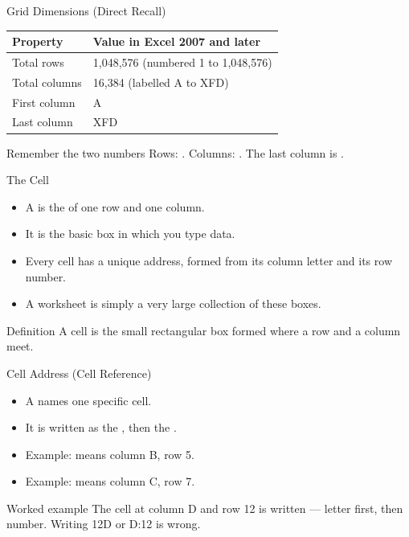 \documentclass[aspectratio=169]{beamer}
\begin{document}
\begin{frame}{Grid Dimensions (Direct Recall)}
  \begin{center}
    \begin{tabular}{ll}
      \toprule
      \textbf{Property} & \textbf{Value in Excel 2007 and later} \\
      \midrule
      Total rows & 1,048,576 (numbered 1 to 1,048,576) \\
      Total columns & 16,384 (labelled A to XFD) \\
      First column & A \\
      Last column & XFD \\
      \bottomrule
    \end{tabular}
  \end{center}
  \vspace{0.3cm}
  \begin{alertblock}{Remember the two numbers}
    Rows: . Columns: . The last column is
    .
  \end{alertblock}
\end{frame}

\begin{frame}{The Cell}
  \begin{itemize}
    \item A  is the  of one row and one column.
    \item It is the basic box in which you type data.
    \item Every cell has a unique address, formed from its column letter and
      its row number.
    \item A worksheet is simply a very large collection of these boxes.
  \end{itemize}
  \begin{block}{Definition}
    A cell is the small rectangular box formed where a row and a column
    meet.
  \end{block}
\end{frame}

\begin{frame}{Cell Address (Cell Reference)}
  \begin{itemize}
    \item A  names one specific cell.
    \item It is written as the , then the
      .
    \item Example:  means column B, row 5.
    \item Example:  means column C, row 7.
  \end{itemize}
  \begin{exampleblock}{Worked example}
    The cell at column D and row 12 is written  --- letter first,
    then number. Writing 12D or D:12 is wrong.
  \end{exampleblock}
\end{frame}
\end{document}
